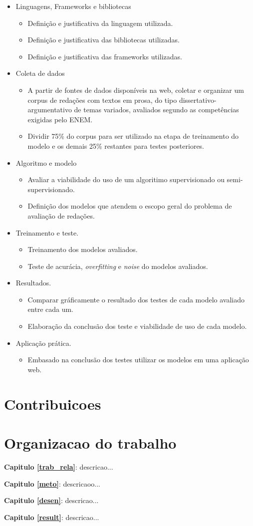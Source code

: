 \begin{itemize}
\item Linguagens, Frameworks e bibliotecas
 \begin{itemize}
  \item Definição e justificativa da linguagem utilizada.
  \item Definição e justificativa das bibliotecas utilizadas.
  \item Definição e justificativa das frameworks utilizadas.
 \end{itemize}
\item Coleta de dados
 \begin{itemize}
  \item A partir de fontes de dados disponíveis na web, coletar e organizar um corpus de redações com textos em prosa, do tipo dissertativo-argumentativo de temas variados, avaliados segundo as competências exigidas pelo ENEM.
  \item Dividir 75\% do corpus para ser utilizado na etapa de treinamento do modelo e os demais 25\% restantes para testes posteriores.
 \end{itemize}
\item Algoritmo e modelo
 \begin{itemize}
  \item Avaliar a viabilidade do uso de um algoritimo supervisionado ou semi-supervisionado.
  \item Definição dos modelos que atendem o escopo geral do problema de avaliação de redações.
 \end{itemize}
\item Treinamento e teste.
 \begin{itemize}
  \item Treinamento dos modelos avaliados.
  \item Teste de acurácia, \textit{overfitting} e \textit{noise} do modelos avaliados.
 \end{itemize}
\item Resultados.
 \begin{itemize}
  \item Comparar gráficamente o resultado dos testes de cada modelo avaliado entre cada um.
  \item Elaboração da conclusão dos teste e viabilidade de uso de cada modelo.
 \end{itemize}
\item Aplicação prática.
 \begin{itemize}
  \item Embasado na conclusão dos testes utilizar os modelos em uma aplicação web. 
 \end{itemize}
\end{itemize}


\section{Contribuicoes}




\section{Organizacao do trabalho}

\noindent \textbf{Capitulo \ref{trab_rela}}: descricao...

\noindent \textbf{Capitulo \ref{meto}}: descricaoo...

\noindent \textbf{Capitulo \ref{desen}}: descricao...

\noindent \textbf{Capitulo \ref{result}}: descricao...